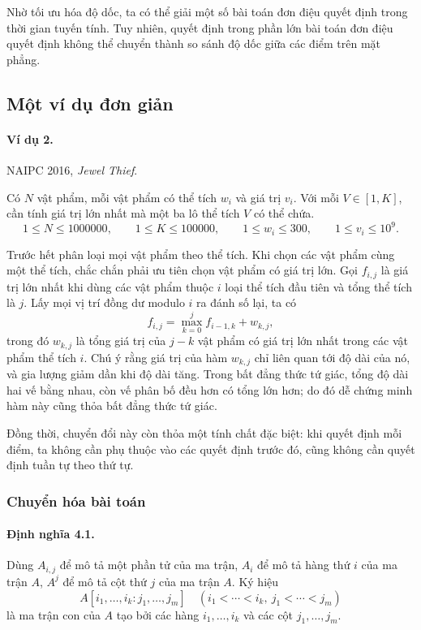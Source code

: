 \documentclass[11pt]{article}
\begin{document}
Nhờ tối ưu hóa độ dốc, ta có thể giải một số bài toán đơn điệu quyết định
trong thời gian tuyến tính. Tuy nhiên, quyết định trong phần lớn bài toán đơn
điệu quyết định không thể chuyển thành so sánh độ dốc giữa các điểm trên mặt
phẳng.

\subsection{Một ví dụ đơn giản}

\paragraph{Ví dụ 2.}
NAIPC 2016, \emph{Jewel Thief}.

Có \(N\) vật phẩm, mỗi vật phẩm có thể tích \(w_i\) và giá trị \(v_i\). Với
mỗi \(V\in[1,K]\), cần tính giá trị lớn nhất mà một ba lô thể tích \(V\) có thể
chứa.
\[
  1\le N\le 1000000,\qquad
  1\le K\le 100000,\qquad
  1\le w_i\le 300,\qquad
  1\le v_i\le 10^9.
\]

Trước hết phân loại mọi vật phẩm theo thể tích. Khi chọn các vật phẩm cùng
một thể tích, chắc chắn phải ưu tiên chọn vật phẩm có giá trị lớn. Gọi
\(f_{i,j}\) là giá trị lớn nhất khi dùng các vật phẩm thuộc \(i\) loại thể
tích đầu tiên và tổng thể tích là \(j\). Lấy mọi vị trí đồng dư modulo \(i\)
ra đánh số lại, ta có
\[
  f_{i,j}=\max_{k=0}^{j} f_{i-1,k}+w_{k,j},
\]
trong đó \(w_{k,j}\) là tổng giá trị của \(j-k\) vật phẩm có giá trị lớn nhất
trong các vật phẩm thể tích \(i\). Chú ý rằng giá trị của hàm \(w_{k,j}\) chỉ
liên quan tới độ dài của nó, và gia lượng giảm dần khi độ dài tăng. Trong bất
đẳng thức tứ giác, tổng độ dài hai vế bằng nhau, còn vế phân bố đều hơn có
tổng lớn hơn; do đó dễ chứng minh hàm này cũng thỏa bất đẳng thức tứ giác.

Đồng thời, chuyển đổi này còn thỏa một tính chất đặc biệt: khi quyết định mỗi
điểm, ta không cần phụ thuộc vào các quyết định trước đó, cũng không cần quyết
định tuần tự theo thứ tự.

\subsubsection{Chuyển hóa bài toán}

\paragraph{Định nghĩa 4.1.}
Dùng \(A_{i,j}\) để mô tả một phần tử của ma trận, \(A_i\) để mô tả hàng thứ
\(i\) của ma trận \(A\), \(A^j\) để mô tả cột thứ \(j\) của ma trận \(A\).
Ký hiệu
\[
  A[i_1,\ldots,i_k:j_1,\ldots,j_m]
  \quad (i_1<\cdots<i_k,\ j_1<\cdots<j_m)
\]
là ma trận con của \(A\) tạo bởi các hàng \(i_1,\ldots,i_k\) và các cột
\(j_1,\ldots,j_m\).
\end{document}
